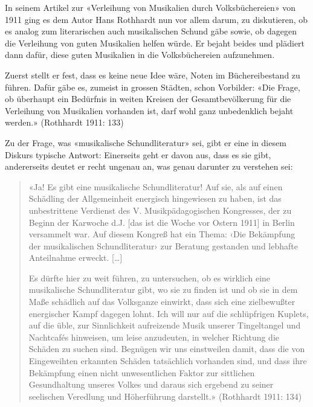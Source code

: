 \documentclass[a4paper,
fontsize=11pt,
oneside,
numbers=noperiodatend,
parskip=half-,
bibliography=totoc,
final
]{scrartcl}
\begin{document}
In seinem Artikel zur «Verleihung von Musikalien durch Volksbüchereien»
von 1911 ging es dem Autor Hans Rothhardt nun vor allem darum, zu
diskutieren, ob es analog zum literarischen auch musikalischen Schund
gäbe sowie, ob dagegen die Verleihung von guten Musikalien helfen würde.
Er bejaht beides und plädiert dann dafür, diese guten Musikalien in die
Volksbüchereien aufzunehmen.

Zuerst stellt er fest, dass es keine neue Idee wäre, Noten im
Büchereibestand zu führen. Dafür gäbe es, zumeist in grossen Städten,
schon Vorbilder: «Die Frage, ob überhaupt ein Bedürfnis in weiten
Kreisen der Gesamtbevölkerung für die Verleihung von Musikalien
vorhanden ist, darf wohl ganz unbedenklich bejaht werden.» (Rothhardt
1911: 133)

Zu der Frage, was «musikalische Schundliteratur» sei, gibt er eine in
diesem Diskurs typische Antwort: Einerseits geht er davon aus, dass es
sie gibt, andererseits deutet er recht ungenau an, was genau darunter zu
verstehen sei:

\begin{quote}
«Ja! Es gibt eine musikalische Schundliteratur! Auf sie, als auf einen
Schädling der Allgemeinheit energisch hingewiesen zu haben, ist das
unbestrittene Verdienst des V. Musikpädagogischen Kongresses, der zu
Beginn der Karwoche d.J. {[}das ist die Woche vor Ostern 1911{]} in
Berlin versammelt war. Auf diesem Kongreß hat ein Thema: ‹Die Bekämpfung
der musikalischen Schundliteratur› zur Beratung gestanden und lebhafte
Anteilnahme erweckt. {[}\ldots{]}

Es dürfte hier zu weit führen, zu untersuchen, ob es wirklich eine
musikalische Schundliteratur gibt, wo sie zu finden ist und ob sie in
dem Maße schädlich auf das Volksganze einwirkt, dass sich eine
zielbewußter energischer Kampf dagegen lohnt. Ich will nur auf die
schlüpfrigen Kuplets, auf die üble, zur Sinnlichkeit aufreizende Musik
unserer Tingeltangel und Nachtcafés hinweisen, um leise anzudeuten, in
welcher Richtung die Schäden zu suchen sind. Begnügen wir uns
einstweilen damit, dass die von Eingeweihten erkannten Schäden
tatsächlich vorhanden sind, und dass ihre Bekämpfung einen nicht
unwesentlichen Faktor zur sittlichen Gesundhaltung unseres Volkes und
daraus sich ergebend zu seiner seelischen Veredlung und Höherführung
darstellt.» (Rothhardt 1911: 134)
\end{quote}
\end{document}
